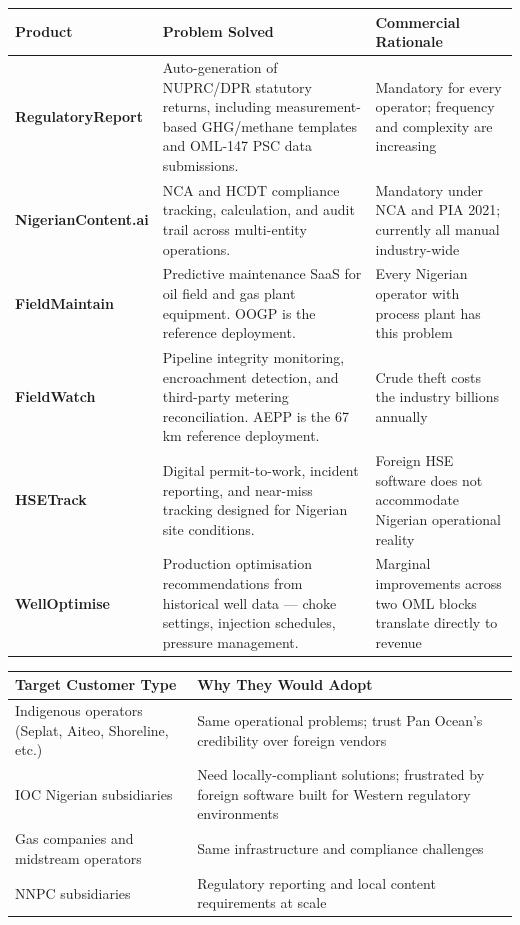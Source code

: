 \documentclass[10pt]{article}
\begin{document}
\vspace{4pt}
\small
\begin{tabularx}{\columnwidth}{@{}lXl@{}}
\toprule
\textbf{Product} & \textbf{Problem Solved} & \textbf{Commercial Rationale} \\
\midrule
\textbf{RegulatoryReport}
  & Auto-generation of NUPRC/DPR statutory returns, including measurement-based
    GHG/methane templates and OML-147 PSC data submissions.
  & Mandatory for every operator; frequency and complexity are increasing \\[4pt]
\textbf{NigerianContent.ai}
  & NCA and HCDT compliance tracking, calculation, and audit trail across
    multi-entity operations.
  & Mandatory under NCA and PIA 2021; currently all manual industry-wide \\[4pt]
\textbf{FieldMaintain}
  & Predictive maintenance SaaS for oil field and gas plant equipment.
    OOGP is the reference deployment.
  & Every Nigerian operator with process plant has this problem \\[4pt]
\textbf{FieldWatch}
  & Pipeline integrity monitoring, encroachment detection, and third-party
    metering reconciliation. AEPP is the 67 km reference deployment.
  & Crude theft costs the industry billions annually \\[4pt]
\textbf{HSETrack}
  & Digital permit-to-work, incident reporting, and near-miss tracking
    designed for Nigerian site conditions.
  & Foreign HSE software does not accommodate Nigerian operational reality \\[4pt]
\textbf{WellOptimise}
  & Production optimisation recommendations from historical well data ---
    choke settings, injection schedules, pressure management.
  & Marginal improvements across two OML blocks translate directly to revenue \\
\bottomrule
\end{tabularx}
\normalsize

\vspace{4pt}
\small
\begin{tabularx}{\columnwidth}{@{}lX@{}}
\toprule
\textbf{Target Customer Type} & \textbf{Why They Would Adopt} \\
\midrule
Indigenous operators (Seplat, Aiteo, Shoreline, etc.)
  & Same operational problems; trust Pan Ocean's credibility over foreign vendors \\
IOC Nigerian subsidiaries
  & Need locally-compliant solutions; frustrated by foreign software built for
    Western regulatory environments \\
Gas companies and midstream operators
  & Same infrastructure and compliance challenges \\
NNPC subsidiaries
  & Regulatory reporting and local content requirements at scale \\
\bottomrule
\end{tabularx}
\normalsize
\end{document}
